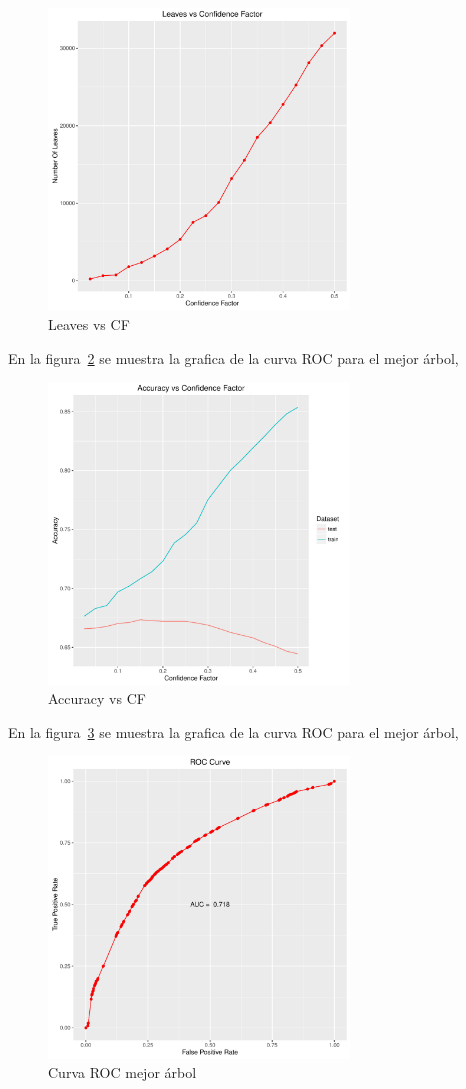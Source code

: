 \begin{figure}
  \centering
  \includegraphics[width = 8cm]{6a.pdf}
  \caption{Leaves vs CF}
  \label{fig:6a}
\end{figure}

En la figura~\ref{fig:6b} se muestra la grafica de la curva ROC para el mejor árbol,

\begin{figure}
  \centering
  \includegraphics[width = 8cm]{6b.pdf}
  \caption{Accuracy vs CF}
  \label{fig:6b}
\end{figure}

En la figura~\ref{fig:6c} se muestra la grafica de la curva ROC para el mejor árbol,

\begin{figure}
  \centering
  \includegraphics[width = 8cm]{6c.pdf}
  \caption{Curva ROC mejor árbol}
  \label{fig:6c}
\end{figure}

